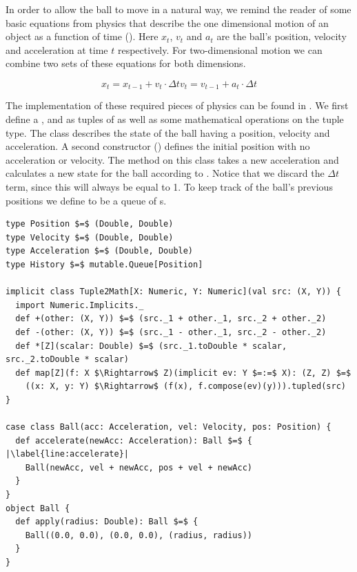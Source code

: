 In order to allow the ball to move in a natural way, we remind the reader of some basic equations from physics that describe the one dimensional motion of an object as a function of time (). Here $x_t$, $v_t$ and $a_t$ are the ball's position, velocity and acceleration at time $t$ respectively. For two-dimensional motion we can combine two sets of these equations for both dimensions.

\begin{subequations}
	\begin{equation}
		x_t = x_{t - 1} + v_t \cdot \Delta t
	\end{equation}
	\begin{equation}
		v_t = v_{t - 1} + a_t \cdot \Delta t
	\end{equation}
	\label{eq:motion}
\end{subequations}

The implementation of these required pieces of physics can be found in . We first define a ,  and  as tuples of  as well as some mathematical operations on the tuple type. The  class describes the state of the ball having a position, velocity and acceleration. A second constructor () defines the initial position with no acceleration or velocity. The method  on this class takes a new acceleration and calculates a new state for the ball according to . Notice that we discard the $\Delta t$ term, since this will always be equal to 1. To keep track of the ball's previous positions we define  to be a queue of s.

\begin{minipage}{\linewidth}
\begin{lstlisting}[style=ScalaStyle, caption={Ball motion physics}, label={lst:ball-physics}]
type Position $=$ (Double, Double)
type Velocity $=$ (Double, Double)
type Acceleration $=$ (Double, Double)
type History $=$ mutable.Queue[Position]

implicit class Tuple2Math[X: Numeric, Y: Numeric](val src: (X, Y)) {
  import Numeric.Implicits._
  def +(other: (X, Y)) $=$ (src._1 + other._1, src._2 + other._2)
  def -(other: (X, Y)) $=$ (src._1 - other._1, src._2 - other._2)
  def *[Z](scalar: Double) $=$ (src._1.toDouble * scalar, src._2.toDouble * scalar)
  def map[Z](f: X $\Rightarrow$ Z)(implicit ev: Y $=:=$ X): (Z, Z) $=$
    ((x: X, y: Y) $\Rightarrow$ (f(x), f.compose(ev)(y))).tupled(src)
}

case class Ball(acc: Acceleration, vel: Velocity, pos: Position) {
  def accelerate(newAcc: Acceleration): Ball $=$ { |\label{line:accelerate}|
    Ball(newAcc, vel + newAcc, pos + vel + newAcc)
  }
}
object Ball {
  def apply(radius: Double): Ball $=$ {
    Ball((0.0, 0.0), (0.0, 0.0), (radius, radius))
  }
}
\end{lstlisting}
\end{minipage}

